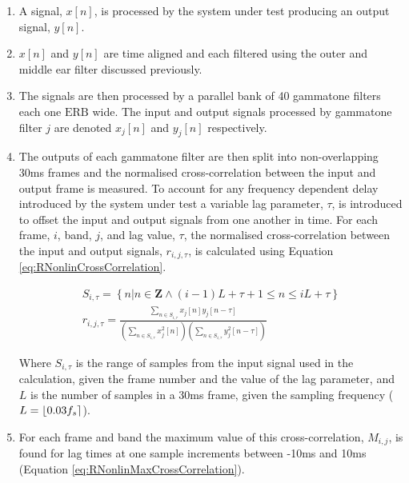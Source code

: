 			\begin{enumerate}
				\item A signal, $x[n]$, is processed by the system under test producing an output signal,
					$y[n]$.

				\item $x[n]$ and $y[n]$ are time aligned and each filtered using the outer and middle ear
					filter discussed previously.

				\item The signals are then processed by a parallel bank of 40 gammatone filters each one
					$\mathrm{ERB}$ wide. The input and output signals processed by gammatone filter $j$
					are denoted $x_j[n]$ and $y_j[n]$ respectively.

				\item The outputs of each gammatone filter are then split into non-overlapping 30ms frames
					and the normalised cross-correlation between the input and output frame is
					measured.  To account for any frequency dependent delay introduced by the system
					under test a variable lag parameter, $\tau$, is introduced to offset the input and
					output signals from one another in time. For each frame, $i$, band, $j$, and lag
					value, $\tau$, the normalised cross-correlation between the input and output
					signals, $r_{i,j,\tau}$, is calculated using Equation
					\ref{eq:RNonlinCrossCorrelation}.

					\begin{gather}
						S_{i,\tau} = \left\{ n | n \in \textbf{Z} 
							   \land (i-1)L+\tau+1 \leq n \leq iL + \tau \right\} \nonumber \\
						r_{i,j,\tau} = \frac{\sum_{n \in S_{i,\tau}} x_{j}[n]y_{j}[n-\tau]}
							{\left( \sum_{n \in S_{i,\tau}} x_{j}^{2}[n] \right) 
							\left( \sum_{n \in S_{i,\tau}} y_{j}^{2}[n-\tau] \right)}
						\label{eq:RNonlinCrossCorrelation}
					\end{gather}

					Where $S_{i,\tau}$ is the range of samples from the input signal used in the
					calculation, given the frame number and the value of the lag parameter, and $L$ is
					the number of samples in a 30ms frame, given the sampling frequency ($L =
					\left\lfloor0.03f_{s}\right\rceil$). 

				\item For each frame and band the maximum value of this cross-correlation, $M_{i,j}$, is
					found for lag times at one sample increments between -10ms and 10ms (Equation
					\ref{eq:RNonlinMaxCrossCorrelation}).


\end{enumerate}
